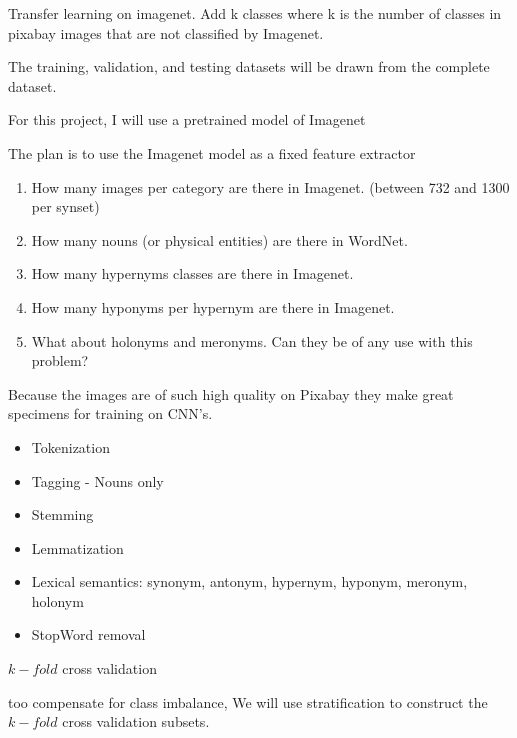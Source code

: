 \documentclass[10pt, a4paper, twocolumn]{article} %
\begin{document}
Transfer learning on imagenet.  Add k classes where k is the number of classes in pixabay images that are not classified by Imagenet.

The training, validation, and testing datasets will be drawn from the complete dataset.

For this project, I will use a pretrained model of Imagenet

The plan is to use the Imagenet model as a fixed feature extractor

\begin{enumerate}
	\item How many images per category are there in Imagenet. (between 732 and 1300 per synset)
	\item How many nouns (or physical entities) are there in WordNet.
	\item How many hypernyms classes are there in Imagenet. 
	\item How many hyponyms per hypernym are there in Imagenet.
	\item What about holonyms and meronyms. Can they be of any use with this problem?
\end{enumerate}

Because the images are of such high quality on Pixabay they make great specimens for training on CNN's.

\begin{itemize}
	\item Tokenization
	\item Tagging - Nouns only
	\item Stemming
	\item Lemmatization
	\item Lexical semantics: synonym, antonym, hypernym, hyponym, meronym, holonym
	\item StopWord removal
\end{itemize}

$k-fold$ cross validation

too compensate for class imbalance, We will use stratification to construct the $k-fold$ cross validation subsets\citep{Kohavi_1995_1137, Sechidis2011}.





\end{document}
